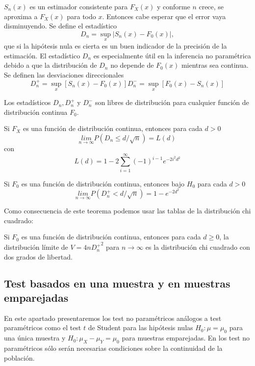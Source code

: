 	$S_n(x)$ es un estimador consistente para $F_X(x)$ y conforme $n$ crece, se aproxima a $F_X(x)$ para todo $x$. Entonces cabe esperar que el error vaya disminuyendo. Se define el estadístico
	\[ D_n = \underset{x}{\sup} 
				\vert S_n(x) - F_0(x) \vert, \]
	que si la hipótesis nula es cierta es un buen indicador de la precisión de la estimación. El estadístico $D_n$ es especialmente útil en la inferencia no paramétrica debido a que la distribución de $D_n$ no depende de $F_0(x)$ mientras sea continua. Se definen las desviaciones direccionales
	\[ D_n^+ = \underset{x}{\sup} [S_n(x) - F_0(x)]
		D_n^- = \underset{x}{\sup} [F_0(x) - S_n(x)]\]
	
\begin{teorema}
	Los estadísticos $D_n, D_n^+$ y $D_n^-$ son libres de distribución para cualquier función de distribución continua $F_0$.
\end{teorema}
	
\begin{teorema}
	Si $F_X$ es una función de distribución continua, entonces para cada $d>0$
	\[ \underset{n \rightarrow \infty}{lim}
			P(D_n \leq d/\sqrt{n}) = L(d) \]
	con
	\[ L(d) = 1 - 2 \sum\limits_{i=1}^\infty 
			(-1)^{i-1} e^{-2i^2d^2}	\]
\end{teorema}

\begin{teorema}
	Si $F_0$ es una función de distribución continua, entonces bajo $H_0$ para cada $d>0$
	\[ \underset{n \rightarrow \infty}{lim}
			P(D_n^+ < d/\sqrt{n}) = 1-e^{-2d^2} \]
\end{teorema}	
	Como consecuencia de este teorema podemos usar las tablas de la distribución chi cuadrado:
	
\begin{corolario}
	Si $F_0$ es una función de distribución continua, entonces para cada $d \geq 0$, la distribución límite de $V = 4n {D_n^+}^2$ para $n \rightarrow \infty$ es la distribución chi cuadrado con dos grados de libertad.
\end{corolario}	
	
	
\subsection{Test basados en una muestra y en muestras emparejadas}
	
	En este apartado presentaremos los test no paramétricos análogos a test paramétricos como el test $t$ de Student para las hipótesis nulas $H_0: \mu = \mu_0$ para una única muestra y $H_0: \mu_X - \mu_Y = \mu_0$ para muestras emparejadas. En los test no paramétricos sólo serán necesarias condiciones sobre la continuidad de la población. 
	
